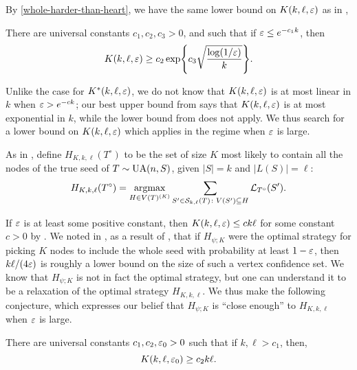 By \eqref{whole-harder-than-heart}, we have the same lower bound on
$K(k, \ell, \varepsilon)$ as in , \ie
\begin{cor}
  There are universal constants $c_1, c_2, c_3 > 0$, and such that if
  $\varepsilon \le e^{- c_1 k}$, then
  \[
    K(k, \ell, \eps) \ge c_2 \exp\left\{ c_3 \sqrt{\frac{\log
        (1/\eps)}{k}}\right\} .
  \]
\end{cor}

Unlike the case for $K^*(k, \ell, \varepsilon)$, we do not know that
$K(k, \ell, \varepsilon)$ is at most linear in $k$ when $\varepsilon > e^{-c k}$;
our best upper bound from  says that
$K(k, \ell, \varepsilon)$ is at most exponential in $k$, while the lower
bound from  does not apply. We thus
search for a lower bound on $K(k, \ell, \varepsilon)$ which applies in the
regime when $\varepsilon$ is large.

As in , define $H_{K, k, \ell}(T^\circ)$ to be the
set of size $K$ most likely to contain all the nodes of the true seed
of $T \sim \operatorname{UA}(n, S)$, given $|S| = k$ and $|L(S)| = \ell$:
\[
  H_{K, k, \ell}(T^\circ) = \operatorname*{argmax}_{H \in V(T)^{(K)}} \sum_{S' \in \mathcal{S}_{k, \ell}(T) \colon V(S') \subseteq H} \mathcal{L}_{T^\circ}(S') .
\]

If $\varepsilon$ is at least some positive constant, then
$K(k, \ell, \varepsilon) \le c k \ell$ for some constant $c > 0$ by
. We noted in , as a result of
, that if $H_{\psi; K}$ were the optimal
strategy for picking $K$ nodes to include the whole seed with
probability at least $1 - \varepsilon$, then $k \ell/(4 \varepsilon)$ is roughly a
lower bound on the size of such a vertex confidence set. We know that
$H_{\psi; K}$ is not in fact the optimal strategy, but one can
understand it to be a relaxation of the optimal strategy
$H_{K, k, \ell}$. We thus make the following conjecture, which
expresses our belief that $H_{\psi; K}$ is ``close enough'' to
$H_{K, k, \ell}$ when $\varepsilon$ is large.
\begin{conj}
  There are universal constants $c_1, c_2 , \varepsilon_0 > 0$ such that if
  $k, \ell > c_1$, then,
  \[
    K(k, \ell, \varepsilon_0) \ge c_2 k \ell .
  \]
\end{conj}

